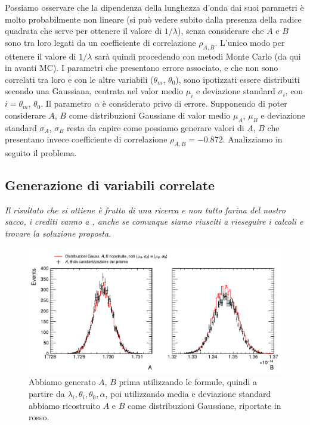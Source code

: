 \documentclass[a4paper,aps,12pt,tightenlines]{revtex4-2}
\begin{document}
Possiamo osservare che la dipendenza della lunghezza d'onda dai suoi parametri è molto probabilmente non lineare (si può vedere subito dalla presenza della radice quadrata che serve per ottenere il valore di $1/\lambda$), senza considerare che $A$ e $B$ sono tra loro legati da un coefficiente di correlazione $\rho_{A,B}$. L'unico modo per ottenere il valore di $1/\lambda$ sarà quindi procedendo con metodi Monte Carlo (da qui in avanti MC). I parametri che presentano errore associato, e che non sono correlati tra loro e con le altre variabili ($\theta_m$, $\theta_0$), sono ipotizzati essere distribuiti secondo una Gaussiana, centrata nel valor medio $\mu_i$ e deviazione standard $\sigma_i$, con $i=\theta_m$, $\theta_0$. Il parametro $\alpha$ è considerato privo di errore. Supponendo di poter considerare $A$, $B$ come distribuzioni Gaussiane di valor medio $\mu_A$, $\mu_B$ e deviazione standard $\sigma_A$, $\sigma_B$ resta da capire come possiamo generare valori di $A$, $B$ che presentano invece coefficiente di correlazione $\rho_{A,B} = \num{-0.872}$. Analizziamo in seguito il problema.

\subsection{Generazione di variabili correlate}
\emph{Il risultato che si ottiene è frutto di una ricerca e non tutto farina del nostro sacco, i crediti vanno a \cite{anthonyAnswerHowDoes2015, sobolevAnswerHowDoes2015}, anche se comunque siamo riusciti a rieseguire i calcoli e trovare la soluzione proposta. }

\begin{figure}
\centering
\includegraphics[width=15cm]{../figures_and_tests/gaus_compAB.pdf}
\caption{Abbiamo generato $A$, $B$ prima utilizzando le formule, quindi a partire da $\lambda_i, \theta_i, \theta_0, \alpha$, poi utilizzando media e deviazione standard abbiamo ricostruito $A$ e $B$ come distribuzioni Gaussiane, riportate in rosso.\label{fig:A_B_gaus}}
\end{figure}
\end{document}
